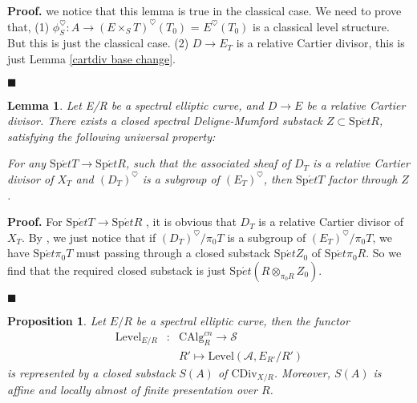 \documentclass[12pt]{article}
\newtheorem{proposition}[theorem]{Proposition}
\newtheorem{lemma}[theorem]{Lemma}
\theoremstyle{thry}
\renewenvironment{proof}
{\par \noindent \textbf{Proof.}}
{ \par \hfill $\blacksquare$ \quad \par }
\def  \CAlg     {\mathrm{CAlg}}
\def  \CDiv     {\mathrm{CDiv}}
\def  \Level    {\mathrm{Level}}
\def  \Spet     {\mathrm{Sp}\acute{e}t}
\def  \ca       {\mathcal{A}}
\def  \cs       {\mathcal{S}}
\begin{document}
\begin{proof}
	we notice that this lemma is true in the classical case.  We need to prove that, (1) $\phi_S^{\heartsuit}: A \to (E \times_S T)^{\heartsuit}(T_0)$ = $E^{\heartsuit}(T_0)$ is a classical level structure.  But this is just the classical case. (2) $D \to E_T$ is a relative Cartier divisor, this is just Lemma \ref{cartdiv base change}.
\end{proof}




\begin{lemma}\label{divisor}
	Let E/R be a spectral elliptic curve, and $D\to E$ be a relative Cartier divisor.  There exists a closed spectral Deligne-Mumford substack $Z \subset \Spet R$, satisfying the following universal property: 
	
	For any $\Spet T \to \Spet R$, such that the associated sheaf of $D_T$  is a relative Cartier divisor of  $X_T$ and $(D_T)^{\heartsuit}$ is a subgroup of $(E_T)^{\heartsuit}$, then $\Spet  T $ factor through $Z$.
\end{lemma}

\begin{proof}
   For $\Spet T\to  \Spet R$ , it is obvious that $D_T$ is a relative Cartier  divisor of $X_T$. By \cite[Corollarly 1.3.7]{katz1985arithmetic},   we just notice that if $(D_T)^{\heartsuit}/\pi_0 T$ is a subgroup of $(E_T)^{\heartsuit}/\pi_0 T$,  we have $\Spet  \pi_0 T$ must passing through  a closed substack $\Spet Z_0$ of $ \Spet \pi_0 R $. So we find that the required closed substack is just $\Spet (R \otimes_{\pi_ 0 R} Z_0) $.
\end{proof}





\begin{proposition}\label{level rep}
	Let $E/R$ be a spectral elliptic curve, then the functor
	\begin{eqnarray*}
	     \Level_{E/R} & :& \CAlg_R^{cn} \to \cs  \\
		       &  &	R' \mapsto \Level(\ca , E_{R'}/R')
	\end{eqnarray*}
	is represented by a  closed substack $S(A)$ of $\CDiv_{X/R}$. Moreover, $S(A)$ is affine and locally almost of finite presentation over $R$. 
\end{proposition}
\end{document}
